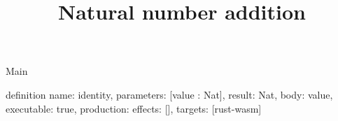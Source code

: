 \begin{lexlean}{Main}
\title{Natural number addition}
\begin{semanticmodule}
definition{
  name: identity,
  parameters: [value : Nat],
  result: Nat,
  body: value,
  executable: true,
  production: {effects: [], targets: [rust-wasm]}
}
\end{semanticmodule}
\end{lexlean}

